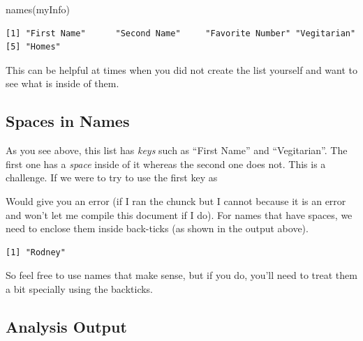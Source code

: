 \documentclass[
  letterpaper,
]{book}
\newenvironment{Shaded}{\begin{snugshade}}{\end{snugshade}}
\newcommand{\AttributeTok}[1]{\textcolor[rgb]{0.40,0.45,0.13}{#1}}
\newcommand{\FunctionTok}[1]{\textcolor[rgb]{0.28,0.35,0.67}{#1}}
\newcommand{\NormalTok}[1]{\textcolor[rgb]{0.00,0.23,0.31}{#1}}
\newcommand{\SpecialCharTok}[1]{\textcolor[rgb]{0.37,0.37,0.37}{#1}}
\newcommand{\StringTok}[1]{\textcolor[rgb]{0.13,0.47,0.30}{#1}}
\begin{document}
\begin{Shaded}
\begin{Highlighting}[]
\FunctionTok{names}\NormalTok{(myInfo)}
\end{Highlighting}
\end{Shaded}

\begin{verbatim}
[1] "First Name"      "Second Name"     "Favorite Number" "Vegitarian"     
[5] "Homes"          
\end{verbatim}

This can be helpful at times when you did not create the list yourself
and want to see what is inside of them.

\subsection{Spaces in Names}\label{spaces-in-names}

As you see above, this list has \emph{keys} such as ``First Name'' and
``Vegitarian''. The first one has a \emph{space} inside of it whereas
the second one does not. This is a challenge. If we were to try to use
the first key as

\begin{Shaded}
\end{Shaded}

Would give you an error (if I ran the chunck but I cannot because it is
an error and won't let me compile this document if I do). For names that
have spaces, we need to enclose them inside back-ticks (as shown in the
output above).

\begin{Shaded}
\end{Shaded}

\begin{verbatim}
[1] "Rodney"
\end{verbatim}

So feel free to use names that make sense, but if you do, you'll need to
treat them a bit specially using the backticks.

\subsection{Analysis Output}\label{analysis-output}
\end{document}

